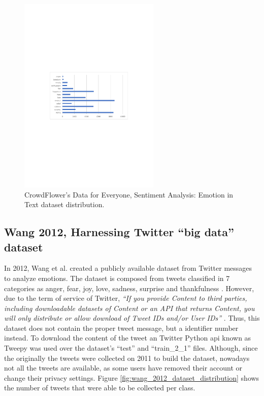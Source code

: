 \begin{figure}[!htp]
  \center
  \includegraphics[width=0.6\textwidth]{figures/crowd_flower_dataset_distribution}
  \caption{CrowdFlower's Data for Everyone, Sentiment Analysis: Emotion in Text dataset distribution.}
  \label{fig:crowdflower_dataset_distribution}
\end{figure}

\FloatBarrier

\subsection{Wang 2012, Harnessing Twitter ``big data'' dataset}

In 2012, Wang et al. created a publicly available dataset from Twitter messages to analyze emotions. The dataset is composed from tweets classified in 7 categories as anger, fear, joy, love, sadness, surprise and thankfulness \cite{wang2012harnessing}. However, due to the term of service of Twitter, \textit{``If you provide Content to third parties, including downloadable datasets of Content or an API that returns Content, you will only distribute or allow download of Tweet IDs and/or User IDs''} \cite{twitterTOS}. Thus, this dataset does not contain the proper tweet message, but a identifier number instead. To download the content of the tweet an Twitter Python \acrshort{api} known as Tweepy \cite{Tweepy} was used over the dataset's ``test'' and ``train\_2\_1'' files. Although, since the originally the tweets were collected on 2011 to build the dataset, nowadays not all the tweets are available, as some users have removed their account or change their privacy settings. Figure \ref{fig:wang_2012_dataset_distribution} shows the number of tweets that were able to be collected per class.

